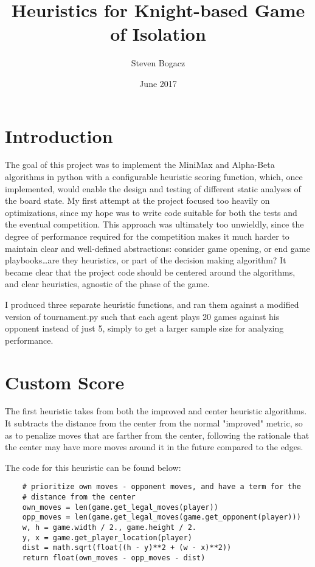\documentclass{article}
\title{Heuristics for Knight-based Game of Isolation}
\author{Steven Bogacz}
\date{June 2017}
\begin{document}
\maketitle
\section{Introduction}
\par The goal of this project was to implement the MiniMax and Alpha-Beta algorithms in python with a configurable heuristic scoring function, 
which, once implemented, would enable the design and testing of different static analyses of the board state. My first attempt at the project focused too
heavily on optimizations, since my hope was to write code suitable for both the tests and the eventual competition. This approach was ultimately too unwieldly, since 
the degree of performance required for the competition makes it much harder to maintain clear and well-defined abstractions: consider game opening, or end game playbooks\ldots are they heuristics, or part of the decision making algorithm? It became clear that the project code should be centered around the algorithms, and clear heuristics, agnostic of the phase of the game. 

I produced three separate heuristic functions, and ran them against a modified version of tournament.py such that each agent plays 20 games against his opponent instead of just 5, simply to get a larger sample size for analyzing performance.

\section{Custom Score}
The first heuristic takes from both the improved and center heuristic algorithms. It subtracts the distance from the
center from the normal "improved" metric, so as to penalize moves that are farther from the center, following the rationale 
that the center may have more moves around it in the future compared to the edges.

The code for this heuristic can be found below:
\begin{lstlisting}
    # prioritize own moves - opponent moves, and have a term for the
    # distance from the center
    own_moves = len(game.get_legal_moves(player))
    opp_moves = len(game.get_legal_moves(game.get_opponent(player)))
    w, h = game.width / 2., game.height / 2.
    y, x = game.get_player_location(player)
    dist = math.sqrt(float((h - y)**2 + (w - x)**2))
    return float(own_moves - opp_moves - dist)
\end{lstlisting}
\end{document}

